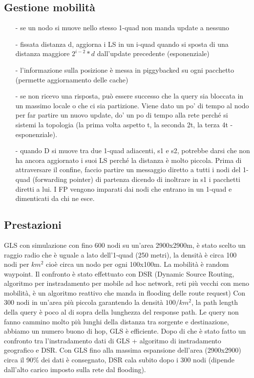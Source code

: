 \documentclass[12pt,italian]{report}
\begin{document}
\subsection{Gestione mobilità}
\begin{itemize}
    \item [-] se un nodo si muove nello stesso 1-quad non manda update a nessuno 
    \item [-] fissata distanza d, aggiorna i LS in un i-quad quando si sposta di una distanza maggiore $2^{i-2}*d$ dall'update precedente (esponenziale)
    \item [-] l'informazione sulla posizione è messa in piggybacked su ogni pacchetto (permette aggiornamento delle cache)
    \item [-] se non ricevo una risposta, può essere successo che la query sia bloccata in un massimo locale o che ci sia partizione. Viene dato un po' di tempo al nodo per far partire un nuovo update, do' un po di tempo alla rete perché si sistemi la topologia (la prima volta aspetto t, la seconda 2t, la terza 4t - esponenziale). 
    \item [-] quando D si muove tra due 1-quad adiacenti, s1 e s2, potrebbe darsi che non ha ancora aggiornato i suoi LS perché la distanza è molto piccola. Prima di attraversare il confine, faccio partire un messaggio diretto a tutti i nodi del 1-quad (forwarding pointer) di partenza dicendo di inoltrare in s1 i pacchetti diretti a lui. I FP vengono imparati dai nodi che entrano in un 1-quad e dimenticati da chi ne esce. 
\end{itemize}

\subsection{Prestazioni}
GLS con simulazione con fino 600 nodi su un'area 2900x2900m, è stato scelto un raggio radio che è uguale a lato dell'1-quad (250 metri), la densità è circa 100 nodi per $km^2$ cioè circa un nodo per ogni 100x100m. La mobilità è random waypoint.
\bigbreak
Il confronto è stato effettuato con DSR (Dynamic Source Routing, algoritmo per instradamento per mobile ad hoc network, reti più vecchi con meno mobilità, è un algoritmo reattivo che manda in flooding delle route request)
\bigbreak
Con 300 nodi in un'area più piccola garantendo la densità $100/km^2$, la path length della query è poco al di sopra della lunghezza del response path. Le query non fanno cammino molto più lunghi della distanza tra sorgente e destinazione, abbiamo un numero buono di hop, GLS è efficiente. 
\bigbreak
Dopo di che è stato fatto un confronto tra l'instradamento dati di GLS + algoritmo di instradamento geografico e DSR. Con GLS fino alla massima espansione dell'area (2900x2900) circa il 90\% dei dati è consegnato, DSR cala subito dopo i 300 nodi (dipende dall'alto carico imposto sulla rete dal flooding).
\end{document}
